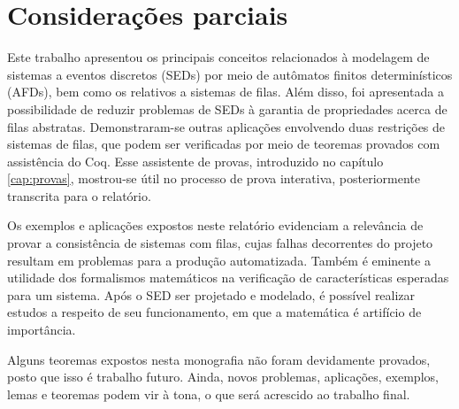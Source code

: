 \chapter{Considerações parciais}
\label{cap:consideracoes}

Este trabalho apresentou os principais conceitos relacionados à modelagem de sistemas a eventos discretos (\acs{SED}s) por meio de autômatos finitos determinísticos (\acs{AFD}s), bem como os relativos a sistemas de filas. Além disso, foi apresentada a possibilidade de reduzir problemas de SEDs à garantia de propriedades acerca de filas abstratas. Demonstraram-se outras aplicações envolvendo duas restrições de sistemas de filas, que podem ser verificadas por meio de teoremas provados com assistência do Coq. Esse assistente de provas, introduzido no capítulo \ref{cap:provas}, mostrou-se útil no processo de prova interativa, posteriormente transcrita para o relatório.

Os exemplos e aplicações expostos neste relatório evidenciam a relevância de provar a consistência de sistemas com filas, cujas falhas decorrentes do projeto resultam em problemas para a produção automatizada. Também é eminente a utilidade dos formalismos matemáticos na verificação de características esperadas para um sistema. Após o SED ser projetado e modelado, é possível realizar estudos a respeito de seu funcionamento, em que a matemática é artifício de importância.

Alguns teoremas expostos nesta monografia não foram devidamente provados, posto que isso é trabalho futuro. Ainda, novos problemas, aplicações, exemplos, lemas e teoremas podem vir à tona, o que será acrescido ao trabalho final.